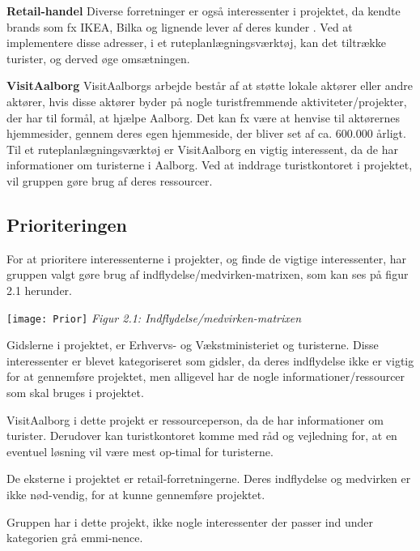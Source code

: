 \textbf{Retail-handel}\newline
Diverse forretninger er også interessenter i projektet, da kendte brands som fx IKEA, Bilka og lignende lever af deres kunder \citep{PengeloseButikker}. Ved at implementere disse adresser, i et ruteplanlægningsværktøj, kan det tiltrække turister, og derved øge omsætningen. 

\textbf{VisitAalborg}\newline
VisitAalborgs arbejde består af at støtte lokale aktører eller andre aktører, hvis disse aktører byder på nogle turistfremmende aktiviteter/projekter, der har til formål, at hjælpe Aalborg. Det kan fx være at henvise til aktørernes hjemmesider, gennem deres egen hjemmeside, der bliver set af ca. 600.000 årligt. \citep{VA}
Til et ruteplanlægningsværktøj er VisitAalborg en vigtig interessent, da de har informationer om turisterne i Aalborg. Ved at inddrage turistkontoret i projektet, vil gruppen gøre brug af deres ressourcer. 

\subsection{Prioriteringen}
For at prioritere interessenterne i projekter, og finde de vigtige interessenter, har gruppen valgt gøre brug af indflydelse/medvirken-matrixen, som kan ses på figur 2.1 herunder.

\texttt{[image: Prior]}
\textit{Figur 2.1: Indflydelse/medvirken-matrixen}\newline
 

Gidslerne i projektet, er Erhvervs- og Vækstministeriet og turisterne. Disse interessenter er blevet kategoriseret som gidsler, da deres indflydelse ikke er vigtig for at gennemføre projektet, men alligevel har de nogle informationer/ressourcer som skal bruges i projektet.

VisitAalborg i dette projekt er ressourceperson, da de har informationer om turister. Derudover kan turistkontoret komme med råd og vejledning for, at en eventuel løsning vil være mest op-timal for turisterne.   

De eksterne i projektet er retail-forretningerne. Deres indflydelse og medvirken er ikke nød-vendig, for at kunne gennemføre projektet. 

Gruppen har i dette projekt, ikke nogle interessenter der passer ind under kategorien grå emmi-nence. 

